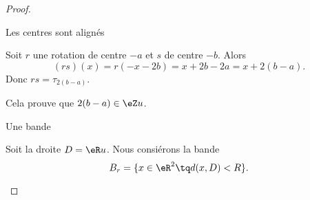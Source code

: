 \begin{proof}
\begin{subproof}
\begin{subproof}
                \item[Les centres sont alignés]

                    Soit \( r\) une rotation de centre \( -a\) et \( s\) de centre \( -b\). Alors
                    \begin{equation}
                        (rs)(x)=r(-x-2b)=x+2b-2a=x+2(b-a).
                    \end{equation}
                    Donc \( rs=\tau_{2(b-a)}\).

                    Cela prouve que \(2(b-a)\in \eZ u\).

                \item[Une bande]

                    Soit la droite \( D=\eR u\). Nous consiérons la bande
                    \begin{equation}
                        B_r=\{ x\in \eR^2\tq d(x,D)<R \}.
                    \end{equation}


\end{subproof}
\end{subproof}
\end{proof}
